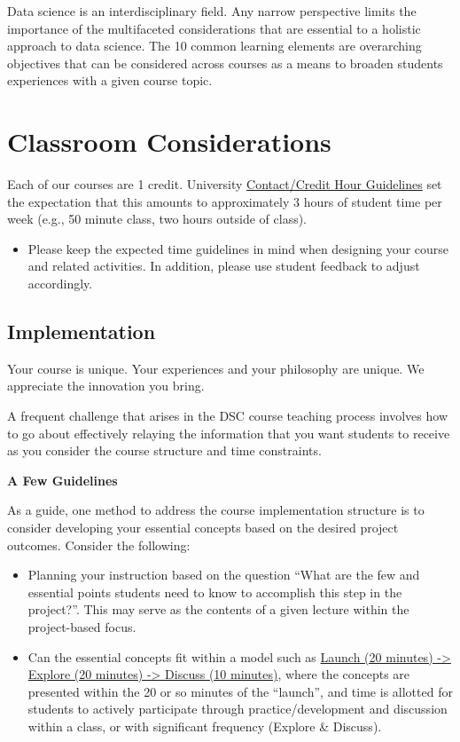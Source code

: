 \documentclass[
]{book}
\providecommand{\tightlist}{%
  \setlength{\itemsep}{0pt}\setlength{\parskip}{0pt}}
\begin{document}
Data science is an interdisciplinary field. Any narrow perspective limits the importance of the multifaceted considerations that are essential to a holistic approach to data science. The 10 common learning elements are overarching objectives that can be considered across courses as a means to broaden students experiences with a given course topic.

\section{Classroom Considerations}\label{classroom-considerations}

Each of our courses are 1 credit. University \href{https://oucc.dasa.ncsu.edu/courses/contact-credit-hours/}{Contact/Credit Hour Guidelines} set the expectation that this amounts to approximately 3 hours of student time per week (e.g., 50 minute class, two hours outside of class).

\begin{itemize}
\tightlist
\item
  Please keep the expected time guidelines in mind when designing your course and related activities. In addition, please use student feedback to adjust accordingly.
\end{itemize}

\subsection{Implementation}\label{implementation}

Your course is unique. Your experiences and your philosophy are unique. We appreciate the innovation you bring.

A frequent challenge that arises in the DSC course teaching process involves how to go about effectively relaying the information that you want students to receive as you consider the course structure and time constraints.

\textbf{A Few Guidelines}

As a guide, one method to address the course implementation structure is to consider developing your essential concepts based on the desired project outcomes. Consider the following:

\begin{itemize}
\item
  Planning your instruction based on the question ``What are the few and essential points students need to know to accomplish this step in the project?''. This may serve as the contents of a given lecture within the project-based focus.
\item
  Can the essential concepts fit within a model such as \href{https://drive.google.com/file/d/13AwDhsoMFh31YdHoxdP_5FaaqUdqkM1W/view}{Launch (20 minutes) -\textgreater{} Explore (20 minutes) -\textgreater{} Discuss (10 minutes)}, where the concepts are presented within the 20 or so minutes of the ``launch'', and time is allotted for students to actively participate through practice/development and discussion within a class, or with significant frequency (Explore \& Discuss).
\end{itemize}
\end{document}
